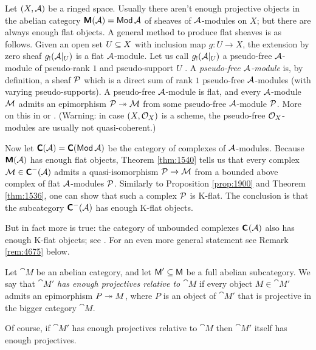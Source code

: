 \begin{exa} \label{exa:4725}
Let $(X, \AA)$ be a ringed space. Usually there aren't enough projective 
objects in the abelian category $\dcat{M}(\AA) = \cat{Mod} \AA$ of sheaves of 
$\AA$-modules on $X$; but there are always enough flat objects. A general method 
to produce flat sheaves is as follows. Given an open set $U \sub X$ with 
inclusion map $g : U \to X$,  
the extension by zero sheaf $g_{!}(\AA|_{U})$ is a flat $\AA$-module.  
Let us call $g_{!}(\AA|_{U})$ a pseudo-free $\AA$-module of pseudo-rank 
$1$ and pseudo-support $U$ . A {\em pseudo-free $\AA$-module} is, by 
definition, a sheaf $\PP$ which is a direct sum of rank $1$ pseudo-free 
$\AA$-modules (with varying pseudo-supports). A pseudo-free $\AA$-module is 
flat, and every $\AA$-module $\MM$ admits an epimorphism
$\PP \surj \MM$ from some pseudo-free $\AA$-module $\PP$. 
More on this in \cite[Proposition II.1.2]{RD} or 
\cite[Proposition 2.4.12]{KaSc1}. 
(Warning: in case $(X, \OO_X)$ is a scheme, the pseudo-free $\OO_X$-modules are 
usually not quasi-coherent.) 

Now let $\dcat{C}(\AA) =  \dcat{C}(\cat{Mod} \AA)$ be the category of complexes 
of $\AA$-modules. Because $\dcat{M}(\AA)$ has enough flat objects, 
Theorem \ref{thm:1540} tells us that every complex 
$\MM \in \dcat{C}^{-}(\AA)$ admits a quasi-isomorphism 
$\PP \to \MM$ from a bounded above complex of flat 
$\AA$-modules $\PP$. Similarly to Proposition \ref{prop:1900} and Theorem 
\ref{thm:1536}, one can show that such a complex $\PP$ is K-flat. 
The conclusion is that the subcategory 
$\dcat{C}^{-}(\AA)$ has enough K-flat objects. 

But in fact more is true: the category of unbounded complexes $\dcat{C}^{}(\AA)$ 
also has enough K-flat objects; see \cite{Spa}. 
For an even more general statement see Remark \ref{rem:4675} below. 
\end{exa}

\begin{dfn} \label{dfn:2895}
Let $\cat{M}$ be an abelian category, and let $\cat{M}' \sub \cat{M}$ be a 
full abelian subcategory. 
We say that {\em $\cat{M}'$ has enough projectives relative to $\cat{M}$} 
if every object $M \in \cat{M}'$ admits an epimorphism 
$P \surj M$, where $P$ is an object of $\cat{M}'$ that is projective in the 
bigger category $\cat{M}$.
\end{dfn}

Of course, if $\cat{M}'$ has enough projectives relative to $\cat{M}$
then $\cat{M}'$ itself has enough projectives. 

